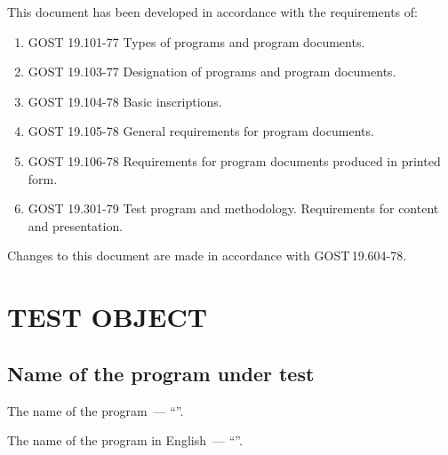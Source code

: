 \documentclass[12pt,a4paper]{extarticle}
\begin{document}
\clearpage

\noindent
This document has been developed in accordance with the requirements of:

\begin{enumerate}[label=\arabic*), leftmargin=1.25cm]
\item GOST 19.101-77 Types of programs and program documents\cite{gost19101}.
\item GOST 19.103-77 Designation of programs and program documents\cite{gost19103}.
\item GOST 19.104-78 Basic inscriptions\cite{gost19104}.
\item GOST 19.105-78 General requirements for program documents\cite{gost19105}.
\item GOST 19.106-78 Requirements for program documents produced
      in printed form\cite{gost19106}.
\item GOST 19.301-79 Test program and methodology. Requirements
      for content and presentation\cite{gost19301}.
\end{enumerate}

Changes to this document are made in accordance with GOST\,19.604-78\cite{gost19604}.

\clearpage

\hypersetup{linkcolor=black}
\tableofcontents
\hypersetup{linkcolor=blue}
\thispagestyle{fancy}
\clearpage

\section{TEST OBJECT}

\subsection{Name of the program under test}

The name of the program~--- \enquote{\projectname}.

The name of the program in English~--- \enquote{\hseProjectNameEn}.
\end{document}
